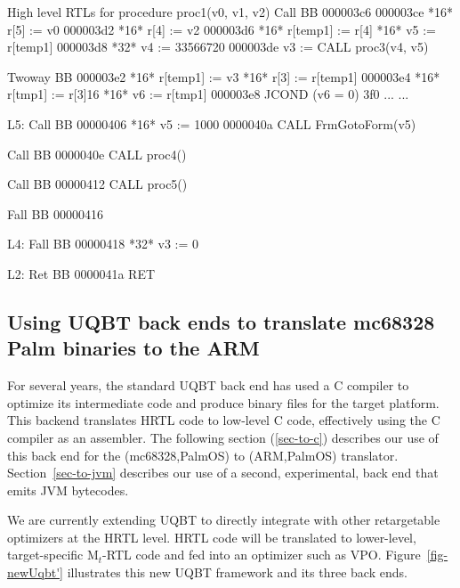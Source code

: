 \centerfigbegin
\begin{fnverbatim}
High level RTLs for procedure proc1(v0, v1, v2)
Call BB 
000003c6
000003ce *16* r[5] := v0
000003d2 *16* r[4] := v2
000003d6 *16* r[temp1] := r[4]
         *16* v5 := r[temp1]
000003d8 *32* v4 := 33566720
000003de  v3 := CALL proc3(v4, v5)

Twoway BB
000003e2 *16* r[temp1] := v3
         *16* r[3] := r[temp1]
000003e4 *16* r[tmp1] := r[3]{16}
         *16* v6 := r[tmp1]
000003e8  JCOND (v6 = 0) 3f0
...       ...

L5: Call BB
00000406 *16* v5 := 1000
0000040a  CALL FrmGotoForm(v5)

Call BB
0000040e  CALL proc4()

Call BB
00000412  CALL proc5()

Fall BB
00000416

L4: Fall BB
00000418 *32* v3 := 0

L2: Ret BB
0000041a  RET                   
\end{fnverbatim}


\subsection{Using UQBT back ends to translate mc68328 Palm binaries to the ARM}
\label{sec-to-arm}
For several years, the standard UQBT back end has used 
a C compiler to optimize its intermediate code
and produce binary files for the target platform.
This backend translates HRTL code to low-level C code,
effectively using the C compiler as an assembler.
The following section (\ref{sec-to-c}) describes our use of this 
back end for the (mc68328,PalmOS) to (ARM,PalmOS) translator.
Section~\ref{sec-to-jvm} describes our use of a second,
experimental, back end that emits JVM bytecodes.

We are currently extending UQBT to directly integrate
with other retargetable optimizers at the HRTL level.
HRTL code will be translated to lower-level, target-specific M$_t$-RTL code
and fed into an optimizer such as VPO.
Figure~\ref{fig-newUqbt'} illustrates this new UQBT framework and its
three back ends.  


